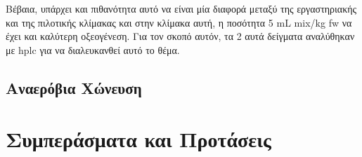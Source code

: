 \documentclass[11pt]{report}
\begin{document}
Βέβαια, υπάρχει και πιθανότητα αυτό να είναι μία διαφορά μεταξύ της εργαστηριακής και της πιλοτικής κλίμακας και στην κλίμακα αυτή, η ποσότητα 5 mL \acrshort{mix}/kg \acrshort{fw} να έχει και καλύτερη οξεογένεση. Για τον σκοπό αυτόν, τα 2 αυτά δείγματα αναλύθηκαν με \acrshort{hplc} για να διαλευκανθεί αυτό το θέμα.

\section{Αναερόβια Χώνευση}
\label{sec:orge0d4ab9}

\chapter{Συμπεράσματα και Προτάσεις}
\label{sec:org8f21153}
\label{sec:conclusion}
\end{document}

